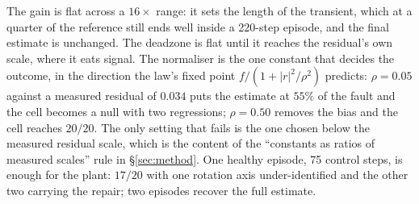 \documentclass{article}
\begin{document}
\begin{center}\small
{}
\end{center}

The gain is flat across a $16\times$ range: it sets the length of the transient, which at a
quarter of the reference still ends well inside a 220-step episode, and the final estimate is
unchanged. The deadzone is flat until it reaches the residual's own scale, where it eats
signal. The normaliser is the one constant that decides the outcome, in the direction the
law's fixed point $f/(1+|r|^2/\rho^2)$ predicts: $\rho=0.05$ against a measured residual of
$0.034$ puts the estimate at $55\%$ of the fault and the cell becomes a null with two
regressions; $\rho=0.50$ removes the bias and the cell reaches $20/20$. The only setting that
fails is the one chosen below the measured residual scale, which is the content of the
``constants as ratios of measured scales'' rule in \S\ref{sec:method}. One healthy episode,
75 control steps, is enough for the plant: $17/20$ with one rotation axis under-identified
and the other two carrying the repair; two episodes recover the full estimate.
\end{document}
